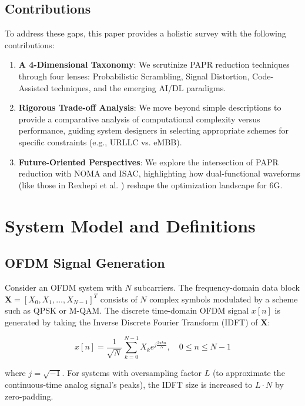 \documentclass[12pt, a4paper, onecolumn]{article}
\begin{document}
\subsection{Contributions}
To address these gaps, this paper provides a holistic survey with the following contributions:

\begin{enumerate}
    \item \textbf{A 4-Dimensional Taxonomy}: We scrutinize PAPR reduction techniques through four lenses: Probabilistic Scrambling, Signal Distortion, Code-Assisted techniques, and the emerging AI/DL paradigms.
    \item \textbf{Rigorous Trade-off Analysis}: We move beyond simple descriptions to provide a comparative analysis of computational complexity versus performance, guiding system designers in selecting appropriate schemes for specific constraints (e.g., URLLC vs. eMBB).
    \item \textbf{Future-Oriented Perspectives}: We explore the intersection of PAPR reduction with NOMA and ISAC, highlighting how dual-functional waveforms (like those in Rexhepi et al. \cite{ref4}) reshape the optimization landscape for 6G.
\end{enumerate}

\section{System Model and Definitions}

\subsection{OFDM Signal Generation}
Consider an OFDM system with $N$ subcarriers. The frequency-domain data block $\mathbf{X} = [X_0, X_1, \dots, X_{N-1}]^T$ consists of $N$ complex symbols modulated by a scheme such as QPSK or M-QAM. The discrete time-domain OFDM signal $x[n]$ is generated by taking the Inverse Discrete Fourier Transform (IDFT) of $\mathbf{X}$:

\begin{equation}
    x[n] = \frac{1}{\sqrt{N}} \sum_{k=0}^{N-1} X_k e^{j \frac{2\pi k n}{N}}, \quad 0 \le n \le N-1
\end{equation}

where $j = \sqrt{-1}$. For systems with oversampling factor $L$ (to approximate the continuous-time analog signal's peaks), the IDFT size is increased to $L \cdot N$ by zero-padding.
\end{document}

